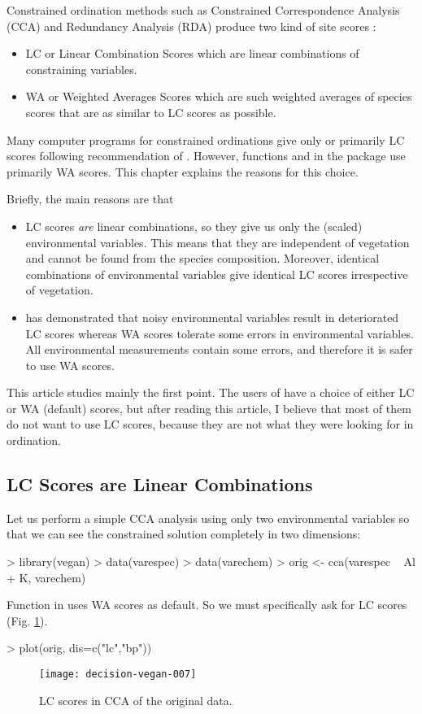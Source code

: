 \documentclass[a4paper,10pt,twocolumn]{article}
\begin{document}
Constrained ordination methods such as Constrained Correspondence
Analysis (CCA) and Redundancy Analysis (RDA) produce two kind of site
scores \cite{Braak86, Palmer93}:
\begin{itemize}
\item
LC or Linear Combination Scores which are linear combinations of
constraining variables.
\item
WA or Weighted Averages Scores which are such weighted averages of
species scores that are as similar to LC scores as possible.
\end{itemize}
Many computer programs for constrained ordinations give only or
primarily LC scores following recommendation of
\citet{Palmer93}.  However, functions  and  in
the  package use primarily WA scores. This chapter
explains the reasons for this choice.

Briefly, the main reasons are that
\begin{itemize}
\item LC scores \emph{are} linear combinations, so they give us only
  the (scaled) environmental variables. This means that they are
  independent of vegetation and cannot be found from the species
  composition.  Moreover, identical combinations of environmental
  variables give identical LC scores irrespective of vegetation.
\item \citet{McCune97} has demonstrated that noisy environmental
  variables result in deteriorated LC scores whereas WA scores
  tolerate some errors in environmental variables.  All environmental
  measurements contain some errors, and therefore it is safer to use
  WA scores.
\end{itemize}
This article studies mainly the first point.  The users of
 have a choice of either LC or WA (default) scores, but
after reading this article, I believe that most of them do not want to
use LC scores, because they are not what they were looking for in
ordination.

\subsection{LC Scores are Linear Combinations}

Let us perform a simple CCA analysis using only two environmental
variables so that we can see the constrained solution completely in
two dimensions:
\begin{Schunk}
\begin{Sinput}
> library(vegan)
> data(varespec)
> data(varechem)
> orig <- cca(varespec ~ Al + K, varechem)
\end{Sinput}
\end{Schunk}
Function  in  uses WA scores as
default. So we must specifically ask for LC scores
(Fig. \ref{fig:ccalc}).
\begin{Schunk}
\begin{Sinput}
> plot(orig, dis=c("lc","bp"))
\end{Sinput}
\end{Schunk}
\begin{figure}
\texttt{[image: decision-vegan-007]}
\caption{LC scores in CCA of the original data.}
\label{fig:ccalc}
\end{figure}
\end{document}

